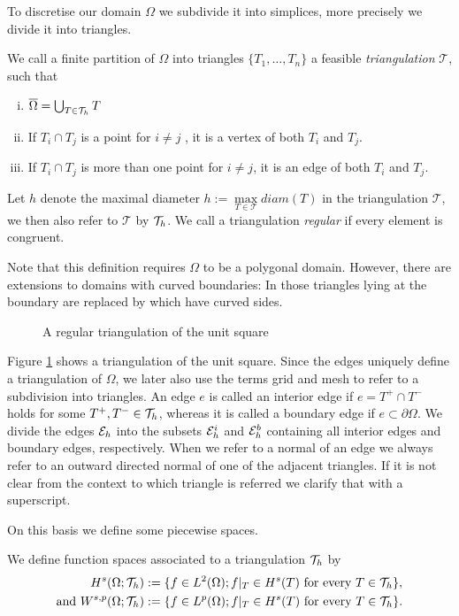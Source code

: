 To discretise our domain $\Omega$ we subdivide it into simplices, more precisely we divide it into triangles.
\begin{definition}
	We call a finite partition of $\Omega$ into triangles $\{T_1, \dots, T_n\}$ a feasible \emph{triangulation} $\mathcal{T}$, such that
	\begin{enumerate}[(i)]
		\item	$\overline \Omega = \bigcup_{T \in \mathcal{T}_h} T$
		\item If $T_i \cap T_j$ is a point for $i \neq j$ , it is a vertex of both $T_i$ and $T_j$.
		\item If $T_i \cap T_j$ is more than one point for $i \neq j$, it is an edge of both $T_i$ and $T_j$.
	\end{enumerate}
	Let $h$ denote the maximal diameter $h:= \operatorname{max}\limits_{T\in \mathcal T} diam(T)$ in the triangulation $\mathcal T$, we then also refer to $\mathcal{T}$ by $\mathcal{T}_h$. We call a triangulation \emph{regular} if every element is congruent.
\end{definition}
Note that this definition requires $\Omega$ to be a polygonal domain. However, there are extensions to domains with curved boundaries: In those triangles lying at the boundary are replaced by  which have curved sides. 

\begin{figure}[H]

\caption{A regular triangulation of the unit square}
 \label{fig: triangulation}
\end{figure}

Figure \ref{fig: triangulation} shows a triangulation of the unit square. Since the edges uniquely define a triangulation of $\Omega$, we later also use the terms grid and mesh to refer to a subdivision into triangles.
An edge $e$ is called an interior edge if $e=T^+ \cap T^-$ holds for some $T^+,T^- \in \mathcal{T}_h$, whereas it is called a boundary edge if $e \subset \partial \Omega$.
We divide the edges $\mathcal{E}_h$ into the subsets $\mathcal{E}_h^i$ and $\mathcal{E}_h^b$ containing all interior edges and boundary edges, respectively. 
When we refer to a normal of an edge we always refer to an outward directed normal of one of the adjacent triangles. If it is not clear from the context to which triangle is referred we clarify that with a superscript.

On this basis we define some piecewise spaces.
\begin{definition}
We define function spaces associated to a triangulation $\mathcal{T}_h$ by
\begin{align*}
	H^s(\Omega;\mathcal{T}_h) &:= \{f \in L^2(\Omega); f|_T \in H^s(T) \text{ for every } T \in \mathcal{T}_h\}, \\
	\text{and }
	W^{s,p}(\Omega;\mathcal{T}_h) &:= \{f \in L^p(\Omega); f|_T \in H^s(T) \text{ for every } T \in \mathcal{T}_h\}.
\end{align*}	
\end{definition}

